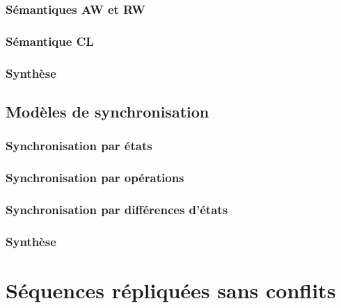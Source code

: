 \documentclass[12pt]{thesul}
\theoremstyle{definition}
\begin{document}
\subsubsection{Sémantiques \acl{AW} et \acl{RW}}


\subsubsection{Sémantique \acl{CL}}


\subsubsection{Synthèse}


\subsection{Modèles de synchronisation}


\subsubsection{Synchronisation par états}


\subsubsection{Synchronisation par opérations}


\subsubsection{Synchronisation par différences d'états}


\subsubsection{Synthèse}


% 

\section{Séquences répliquées sans conflits}

\end{document}
